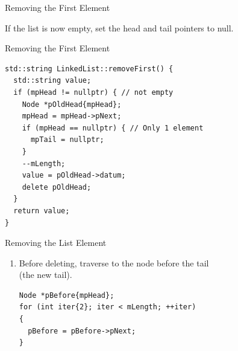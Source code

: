 \documentclass[14pt,aspectratio=1610, hyperref={pdfpagelayout=SinglePage}]{beamer}
\begin{document}
\begin{frame}{Removing the First Element}
  \begin{center}
    \large
    If the list is now empty, set the head and tail pointers to null.
  \end{center}
\end{frame}

\begin{frame}[fragile]{Removing the First Element}
\begin{lstlisting}[basicstyle=\small\ttfamily]
std::string LinkedList::removeFirst() {
  std::string value;
  if (mpHead != nullptr) { // not empty
    Node *pOldHead{mpHead};
    mpHead = mpHead->pNext;
    if (mpHead == nullptr) { // Only 1 element
      mpTail = nullptr;
    }
    --mLength;
    value = pOldHead->datum;
    delete pOldHead;
  }
  return value;
}
\end{lstlisting}
\end{frame}

\begin{frame}[fragile, b]{Removing the List Element}
\begin{enumerate}
\item Before deleting, traverse to the node before the tail\\(the new tail).\\
\begin{lstlisting}
Node *pBefore{mpHead};
for (int iter{2}; iter < mLength; ++iter)
{
  pBefore = pBefore->pNext;
}
\end{lstlisting}
\end{enumerate}
\vspace{-1em}
\begin{center}
\end{center}
\vspace{1em}
\end{frame}
\end{document}
